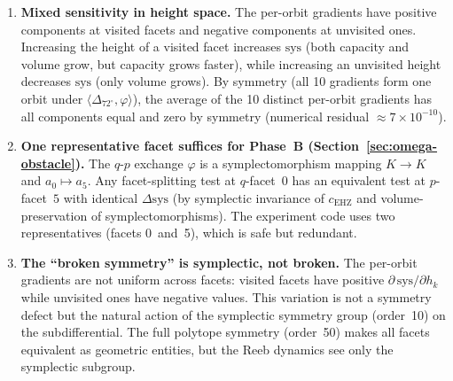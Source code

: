 \begin{enumerate}
\item \textbf{Mixed sensitivity in height space.}
  The per-orbit gradients have positive components at visited facets
  and negative components at unvisited ones.
  Increasing the height of a visited facet increases
  $\mathrm{sys}$ (both capacity and volume grow, but capacity
  grows faster), while increasing an unvisited height
  decreases $\mathrm{sys}$ (only volume grows).
  By symmetry (all 10 gradients form one orbit under
  $\langle \Delta_{72^\circ}, \varphi \rangle$),
  the average of the 10 distinct per-orbit gradients has all
  components equal and zero by symmetry (numerical residual $\approx 7 \times 10^{-10}$).

\item \textbf{One representative facet suffices for Phase~B
  (Section~\ref{sec:omega-obstacle}).}
  The $q$\nobreakdash-$p$ exchange $\varphi$ is a symplectomorphism
  mapping $K \to K$ and $a_0 \mapsto a_5$.
  Any facet-splitting test at $q$-facet~$0$ has an equivalent test at
  $p$-facet~$5$ with identical $\Delta\mathrm{sys}$
  (by symplectic invariance of $c_{\mathrm{EHZ}}$
  and volume-preservation of symplectomorphisms).
  The experiment code uses two representatives (facets 0~and~5), which
  is safe but redundant.

\item \textbf{The ``broken symmetry'' is symplectic, not broken.}
  The per-orbit gradients are not uniform across facets: visited facets
  have positive $\partial\,\mathrm{sys}/\partial h_k$
  while unvisited ones have negative values.
  This variation is not a symmetry defect but the natural action of the
  symplectic symmetry group (order~10) on the subdifferential.
  The full polytope symmetry (order~50) makes all facets equivalent
  as geometric entities, but the Reeb dynamics see only the symplectic
  subgroup.
\end{enumerate}
